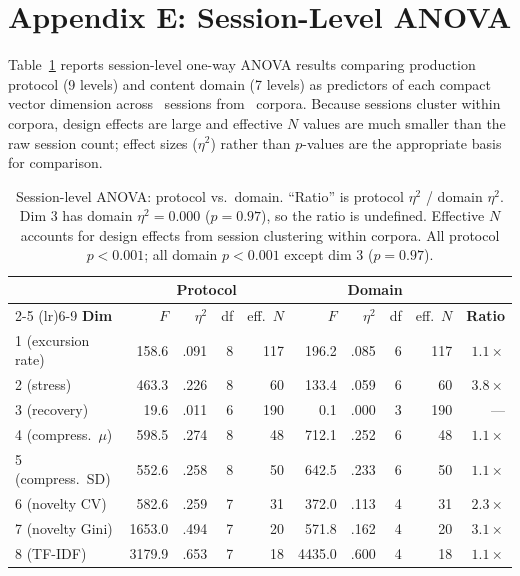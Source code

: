\documentclass[11pt]{article}
\begin{document}
\clearpage

\section{Appendix E: Session-Level ANOVA}

Table~\ref{tbl:session-anova} reports session-level one-way ANOVA results comparing production protocol (9 levels) and content domain (7 levels) as predictors of each compact vector dimension across \anovaSessions\ sessions from \anovaCorpora\ corpora. Because sessions cluster within corpora, design effects are large and effective $N$ values are much smaller than the raw session count; effect sizes ($\eta^2$) rather than $p$-values are the appropriate basis for comparison.

\begin{table}[h!]
\centering
\small
\caption{Session-level ANOVA: protocol vs.\ domain. ``Ratio'' is protocol $\eta^2$ / domain $\eta^2$. Dim 3 has domain $\eta^2 = 0.000$ ($p = 0.97$), so the ratio is undefined. Effective $N$ accounts for design effects from session clustering within corpora. All protocol $p < 0.001$; all domain $p < 0.001$ except dim 3 ($p = 0.97$).}
\label{tbl:session-anova}
\begin{tabular}{l rrrr rrrr r}
\toprule
& \multicolumn{4}{c}{\textbf{Protocol}} & \multicolumn{4}{c}{\textbf{Domain}} & \\
\cmidrule(lr){2-5} \cmidrule(lr){6-9}
\textbf{Dim} & $F$ & $\eta^2$ & df & eff.\ $N$ & $F$ & $\eta^2$ & df & eff.\ $N$ & \textbf{Ratio} \\
\midrule
1 (excursion rate)   & 158.6 & .091 & 8 & 117 & 196.2 & .085 & 6 & 117 & $1.1\times$ \\
2 (stress)      & 463.3 & .226 & 8 &  60 & 133.4 & .059 & 6 &  60 & $3.8\times$ \\
3 (recovery)    &  19.6 & .011 & 6 & 190 &   0.1 & .000 & 3 & 190 & --- \\
4 (compress.\ $\mu$) & 598.5 & .274 & 8 & 48 & 712.1 & .252 & 6 & 48 & $1.1\times$ \\
5 (compress.\ SD)    & 552.6 & .258 & 8 & 50 & 642.5 & .233 & 6 & 50 & $1.1\times$ \\
6 (novelty CV)  & 582.6 & .259 & 7 &  31 & 372.0 & .113 & 4 &  31 & $2.3\times$ \\
7 (novelty Gini) & 1653.0 & .494 & 7 & 20 & 571.8 & .162 & 4 & 20 & $3.1\times$ \\
8 (TF-IDF)      & 3179.9 & .653 & 7 &  18 & 4435.0 & .600 & 4 & 18 & $1.1\times$ \\
\bottomrule
\end{tabular}
\end{table}
\end{document}
